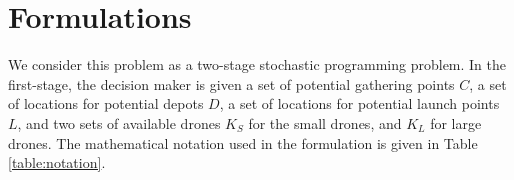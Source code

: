 \documentclass[preprint,review,11pt,authoryear]{elsarticle}
\begin{document}
\section{Formulations}\label{sec:formulation}
We consider this problem as a two-stage stochastic programming problem. In the first-stage, the decision maker is given a set of potential gathering points $C$, a set of locations for potential depots $D$, a set of locations for  potential launch points $L$, and two sets of available drones $K_S$ for the small drones, and $K_L$ for large drones. The mathematical notation used in the formulation is given in Table \ref{table:notation}. 
\newpage
\begin{table}[h!]  
\center
\renewcommand{\arraystretch}{1.2}
\caption{Notation}
\end{table}
\end{document}
